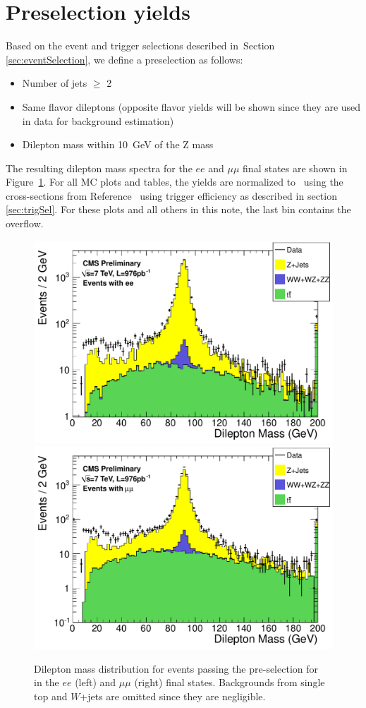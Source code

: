 \section{Preselection yields}
\label{sec:yields}

Based on the event and trigger selections described in~Section \ref{sec:eventSelection}, 
we define a preselection as follows:
\begin{itemize}
\item Number of jets $\geq$ 2
\item Same flavor dileptons (opposite flavor yields will be shown since 
  they are used in data for \ttbar background estimation)
\item Dilepton mass within 10~GeV of the Z mass
\end{itemize}

The resulting dilepton mass spectra for the $ee$ and $\mu\mu$ final states are shown in 
Figure~\ref{fig:dilmass}.
For all MC plots and tables, the yields are normalized to \lumi\ using the cross-sections
from Reference~\cite{ref:xsec} 
using trigger efficiency as described in section \ref{sec:trigSel}.
For these plots and all others in this note, the last bin contains the overflow.

\begin{figure}[hbt]
  \begin{center}
	\includegraphics[width=0.48\linewidth]{plots/hdilmass_ee_allj.pdf}
	\includegraphics[width=0.48\linewidth]{plots/hdilmass_mm_allj.pdf}
	\caption{
	  \label{fig:dilmass}\protect 
	  Dilepton mass distribution for events passing the pre-selection for \lumi~
	  in the $ee$ (left) and $\mu\mu$ (right) final states. Backgrounds from 
	  single top and $W$+jets are omitted
	  since they are negligible.}
  \end{center}
\end{figure}


